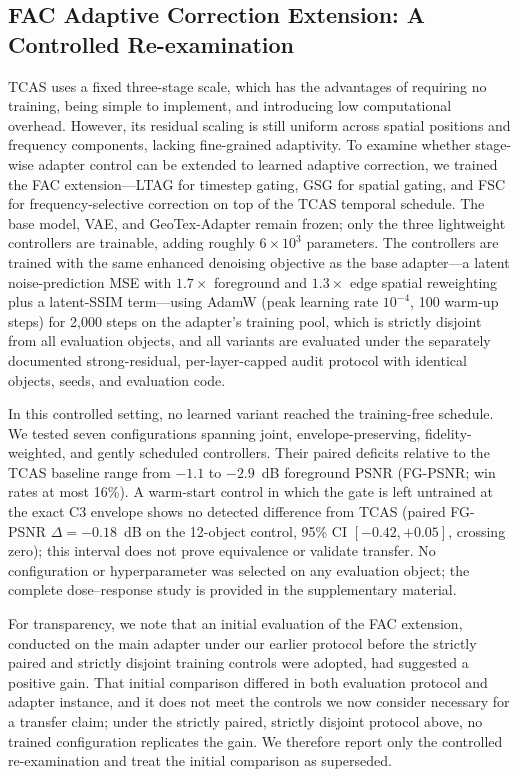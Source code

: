 \documentclass[times,twocolumn,final]{elsarticle}
\begin{document}
\fi

\subsection{FAC Adaptive Correction Extension: A Controlled Re-examination}
\label{subsec:facexp}

TCAS uses a fixed three-stage scale, which has the advantages of requiring no training, being simple to implement, and introducing low computational overhead. However, its residual scaling is still uniform across spatial positions and frequency components, lacking fine-grained adaptivity. To examine whether stage-wise adapter control can be extended to learned adaptive correction, we trained the FAC extension---LTAG for timestep gating, GSG for spatial gating, and FSC for frequency-selective correction on top of the TCAS temporal schedule. The base model, VAE, and GeoTex-Adapter remain frozen; only the three lightweight controllers are trainable, adding roughly $6\times10^{3}$ parameters. The controllers are trained with the same enhanced denoising objective as the base adapter---a latent noise-prediction MSE with $1.7\times$ foreground and $1.3\times$ edge spatial reweighting plus a latent-SSIM term---using AdamW (peak learning rate $10^{-4}$, 100 warm-up steps) for 2{,}000 steps on the adapter's training pool, which is strictly disjoint from all evaluation objects, and all variants are evaluated under the separately documented strong-residual, per-layer-capped audit protocol with identical objects, seeds, and evaluation code.

In this controlled setting, no learned variant reached the training-free schedule. We tested seven configurations spanning joint, envelope-preserving, fidelity-weighted, and gently scheduled controllers. Their paired deficits relative to the TCAS baseline range from $-1.1$ to $-2.9$~dB foreground PSNR (FG-PSNR; win rates at most 16\%). A warm-start control in which the gate is left untrained at the exact C3 envelope shows no detected difference from TCAS (paired FG-PSNR $\Delta=-0.18$~dB on the 12-object control, 95\% CI $[-0.42,+0.05]$, crossing zero); this interval does not prove equivalence or validate transfer. No configuration or hyperparameter was selected on any evaluation object; the complete dose--response study is provided in the supplementary material.

For transparency, we note that an initial evaluation of the FAC extension, conducted on the main adapter under our earlier protocol before the strictly paired and strictly disjoint training controls were adopted, had suggested a positive gain. That initial comparison differed in both evaluation protocol and adapter instance, and it does not meet the controls we now consider necessary for a transfer claim; under the strictly paired, strictly disjoint protocol above, no trained configuration replicates the gain. We therefore report only the controlled re-examination and treat the initial comparison as superseded.
\end{document}
